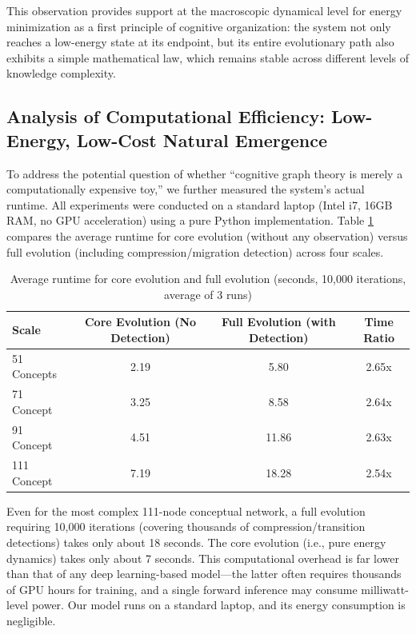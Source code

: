 \documentclass[10pt,onecolumn]{article}
\begin{document}
This observation provides support at the macroscopic dynamical level for energy minimization as a first principle of cognitive organization: the system not only reaches a low-energy state at its endpoint, but its entire evolutionary path also exhibits a simple mathematical law, which remains stable across different levels of knowledge complexity.

\subsection{Analysis of Computational Efficiency: Low-Energy, Low-Cost Natural Emergence}

To address the potential question of whether “cognitive graph theory is merely a computationally expensive toy,” we further measured the system’s actual runtime. All experiments were conducted on a standard laptop (Intel i7, 16GB RAM, no GPU acceleration) using a pure Python implementation. Table \ref{tab:time_comparison} compares the average runtime for core evolution (without any observation) versus full evolution (including compression/migration detection) across four scales.

\begin{table}[H]
\centering
\caption{Average runtime for core evolution and full evolution (seconds, 10,000 iterations, average of 3 runs)}
\label{tab:time_comparison}
\begin{tabular}{lccc}
\toprule
\textbf{Scale} & \textbf{Core Evolution (No Detection)} & \textbf{Full Evolution (with Detection)} & \textbf{Time Ratio} \\
\midrule
51 Concepts & 2.19 & 5.80 & 2.65x \\
71 Concept & 3.25 & 8.58 & 2.64x \\
91 Concept & 4.51 & 11.86 & 2.63x \\
111 Concept & 7.19 & 18.28 & 2.54x \\
\bottomrule
\end{tabular}
\end{table}

Even for the most complex 111-node conceptual network, a full evolution requiring 10,000 iterations (covering thousands of compression/transition detections) takes only about 18 seconds. The core evolution (i.e., pure energy dynamics) takes only about 7 seconds. This computational overhead is far lower than that of any deep learning-based model—the latter often requires thousands of GPU hours for training, and a single forward inference may consume milliwatt-level power. Our model runs on a standard laptop, and its energy consumption is negligible.
\end{document}

